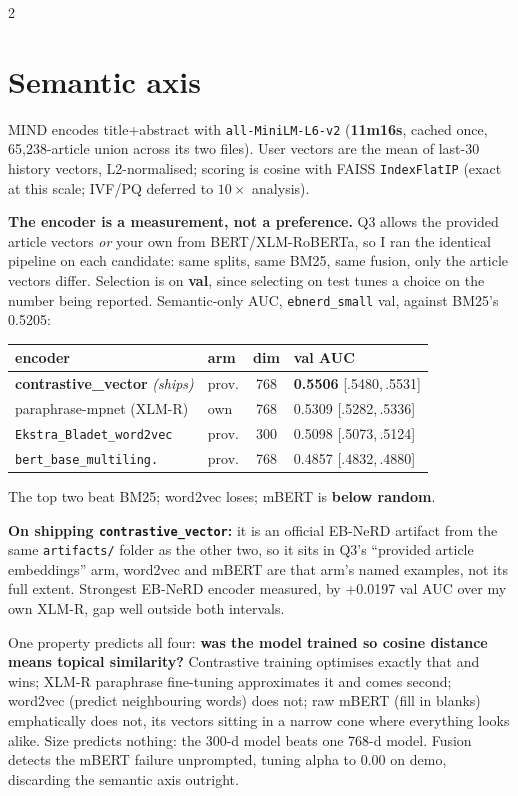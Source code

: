 \documentclass[10pt,a4paper]{article}
\newcommand{\tabsize}{\footnotesize}
\newcommand{\ci}[2]{{\scriptsize[#1,\,#2]}}
\begin{document}
\begin{multicols}{2}
\section{Semantic axis}

MIND encodes title+abstract with \texttt{all-MiniLM-L6-v2} (\textbf{11m16s}, cached once,
65,238-article union across its two files). User vectors are the mean of last-30 history vectors,
L2-normalised; scoring is cosine with FAISS \texttt{IndexFlatIP} (exact at this scale; IVF/PQ deferred
to $10\times$ analysis).

\textbf{The encoder is a measurement, not a preference.} Q3 allows the provided article vectors
\emph{or} your own from BERT/XLM-RoBERTa, so I ran the identical pipeline on each candidate: same
splits, same BM25, same fusion, only the article vectors differ. Selection is on \textbf{val}, since
selecting on test tunes a choice on the number being reported. Semantic-only AUC,
\texttt{ebnerd\_small} val, against BM25's 0.5205:

\begin{center}\tabsize
\begin{tabular}{@{}llcl@{}}
\toprule
encoder & arm & dim & val AUC \\
\midrule
\textbf{contrastive\_vector} \emph{(ships)} & prov. & 768 & \textbf{0.5506} \ci{.5480}{.5531} \\
paraphrase-mpnet (XLM-R) & own & 768 & 0.5309 \ci{.5282}{.5336} \\
\texttt{Ekstra\_Bladet\_word2vec} & prov. & 300 & 0.5098 \ci{.5073}{.5124} \\
\texttt{bert\_base\_multiling.} & prov. & 768 & 0.4857 \ci{.4832}{.4880} \\
\bottomrule
\end{tabular}
\end{center}

The top two beat BM25; word2vec loses; mBERT is \textbf{below random}.

\textbf{On shipping \texttt{contrastive\_vector}:} it is an official EB-NeRD artifact from the same
\texttt{artifacts/} folder as the other two, so it sits in Q3's ``provided article embeddings'' arm,
word2vec and mBERT are that arm's named examples, not its full extent. Strongest EB-NeRD encoder
measured, by +0.0197 val AUC over my own XLM-R, gap well outside both intervals.

One property predicts all four: \textbf{was the model trained so cosine distance means topical
similarity?} Contrastive training optimises exactly that and wins; XLM-R paraphrase fine-tuning
approximates it and comes second; word2vec (predict neighbouring words) does not; raw mBERT (fill in
blanks) emphatically does not, its vectors sitting in a narrow cone where everything looks alike. Size
predicts nothing: the 300-d model beats one 768-d model. Fusion detects the mBERT failure unprompted,
tuning alpha to 0.00 on demo, discarding the semantic axis outright.


\end{multicols}
\end{document}
